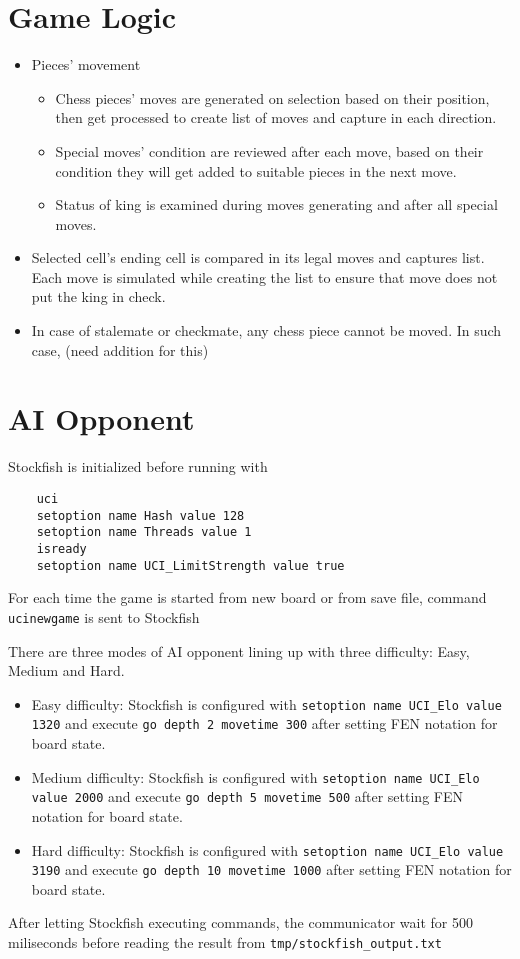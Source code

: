 \documentclass[a4paper, 10pt, titlepage]{report}
\begin{document}
\section{Game Logic}
\begin{itemize}
    \item Pieces' movement
          \begin{itemize}
              \item Chess pieces' moves are generated on selection based on their position, then get processed to create list of moves and capture in each direction.
              \item Special moves' condition are reviewed after each move, based on their condition they will get added to suitable pieces in the next move.
              \item Status of king is examined during moves generating and after all special moves.
          \end{itemize}
    \item Selected cell's ending cell is compared in its legal moves and captures list. Each move is simulated while creating the list to ensure that move does not put the king in check.
    \item In case of stalemate or checkmate, any chess piece cannot be moved. In such case, (need addition for this)
\end{itemize}
\section{AI Opponent}
Stockfish is initialized before running with
\begin{verbatim}
    uci
    setoption name Hash value 128
    setoption name Threads value 1
    isready
    setoption name UCI_LimitStrength value true
    \end{verbatim}

For each time the game is started from new board or from save file, command \texttt{ucinewgame} is sent to Stockfish

There are three modes of AI opponent lining up with three difficulty: Easy, Medium and Hard.
\begin{itemize}
    \item Easy difficulty: Stockfish is configured with \texttt{setoption name UCI\_Elo value 1320} and execute \texttt{go depth 2 movetime 300} after setting FEN notation for board state.
    \item Medium difficulty: Stockfish is configured with \texttt{setoption name UCI\_Elo value 2000} and execute \texttt{go depth 5 movetime 500} after setting FEN notation for board state.
    \item Hard difficulty: Stockfish is configured with \texttt{setoption name UCI\_Elo value 3190} and execute \texttt{go depth 10 movetime 1000} after setting FEN notation for board state.
\end{itemize}
After letting Stockfish executing commands, the communicator wait for 500 miliseconds before reading the result from \texttt{tmp/stockfish\_output.txt}
\end{document}
